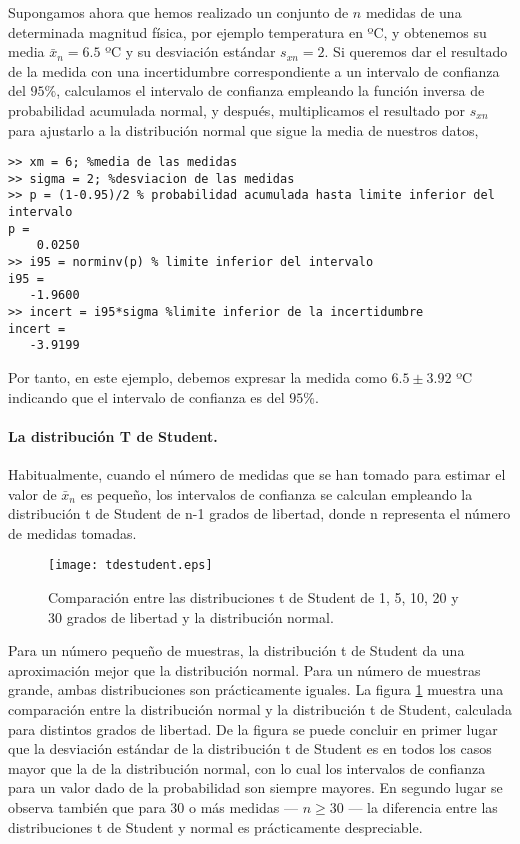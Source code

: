 Supongamos ahora que hemos realizado un conjunto de $n$ medidas de una determinada magnitud física, por ejemplo temperatura en ºC, y obtenemos su media $\bar{x}_n=6.5$ ºC y su desviación estándar $s_{xn}=2$. Si queremos dar el resultado de la medida con una incertidumbre correspondiente a un intervalo de confianza del $95\%$, calculamos el intervalo de confianza empleando la función inversa de probabilidad acumulada normal, y después, multiplicamos el resultado por $s_{xn}$ para ajustarlo a la distribución normal que sigue la media de nuestros datos, 

\begin{verbatim}
>> xm = 6; %media de las medidas
>> sigma = 2; %desviacion de las medidas
>> p = (1-0.95)/2 % probabilidad acumulada hasta limite inferior del intervalo
p =
    0.0250
>> i95 = norminv(p) % limite inferior del intervalo
i95 =
   -1.9600 
>> incert = i95*sigma %limite inferior de la incertidumbre
incert =
   -3.9199
\end{verbatim}

Por tanto, en este ejemplo, debemos expresar la medida como $6.5 \pm 3.92$ ºC indicando que el intervalo de confianza es del $95\%$.

\paragraph{La distribución T de Student.} Habitualmente, cuando el número de medidas que se han tomado para estimar el valor de $\bar{x}_n$ es pequeño, los intervalos de confianza se calculan empleando la distribución t de Student de n-1 grados de libertad, donde  n representa el número de medidas tomadas.

\begin{figure}[h]
\centering
\texttt{[image: tdestudent.eps]}
\caption{Comparación entre las distribuciones t de Student de 1, 5, 10, 20 y 30 grados de libertad y la distribución normal.}
\label{fig:tdst}
\end{figure}

Para un número pequeño de muestras, la distribución t de Student da una aproximación mejor que la distribución normal. Para un número de muestras grande, ambas distribuciones son prácticamente iguales.  La figura \ref{fig:tdst} muestra una comparación entre la distribución normal y la distribución t de Student, calculada para distintos grados de libertad. De la figura se puede concluir en primer lugar que la desviación estándar de la distribución t de Student es en todos los casos mayor que la de la distribución normal, con lo cual los intervalos de confianza para un valor dado de la probabilidad son siempre mayores. En segundo lugar se observa también que para 30 o más medidas --- $n\geqslant 30$ --- la diferencia entre las distribuciones t de Student y normal es prácticamente despreciable.


